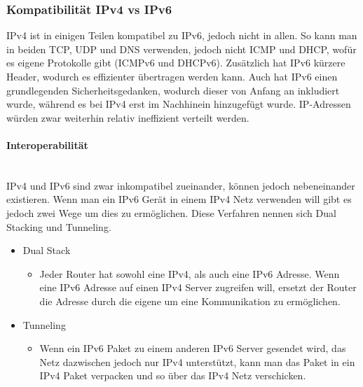 \documentclass{article}
\newcommand{\paragraphlb}[1]{\paragraph{#1}\mbox{}\\}
\begin{document}
	  \subsubsection{Kompatibilität IPv4 vs IPv6}
	  IPv4 ist in einigen Teilen kompatibel zu IPv6, jedoch nicht in allen. So kann man in beiden TCP, UDP und DNS verwenden, jedoch nicht ICMP und DHCP, wofür es eigene Protokolle gibt (ICMPv6 und DHCPv6). Zusätzlich hat IPv6 kürzere Header, wodurch es effizienter übertragen werden kann. Auch hat IPv6 einen grundlegenden Sicherheitsgedanken, wodurch dieser von Anfang an inkludiert wurde, während es bei IPv4 erst im Nachhinein hinzugefügt wurde. IP-Adressen würden zwar weiterhin relativ ineffizient verteilt werden. \\
	  \paragraphlb{Interoperabilität}
	  IPv4 und IPv6 sind zwar inkompatibel zueinander, können jedoch nebeneinander existieren. Wenn man ein IPv6 Gerät in einem IPv4 Netz verwenden will gibt es jedoch zwei Wege um dies zu ermöglichen. Diese Verfahren nennen sich Dual Stacking und Tunneling.
	  \begin{itemize}
	  	 	\item{Dual Stack}
	  	 	\begin{itemize}
	  	 		\item{Jeder Router hat sowohl eine IPv4, als auch eine IPv6 Adresse. Wenn eine IPv6 Adresse auf einen IPv4 Server zugreifen will, ersetzt der Router die Adresse durch die eigene um eine Kommunikation zu ermöglichen.}
	  	 	\end{itemize}
	  	 	\item{Tunneling}
	  	 	\begin{itemize}
	  	 		\item{Wenn ein IPv6 Paket zu einem anderen IPv6 Server gesendet wird, das Netz dazwischen jedoch nur IPv4 unterstützt, kann man das Paket in ein IPv4 Paket verpacken und so über das IPv4 Netz verschicken.}
	  	 	\end{itemize}
	  \end{itemize}	 
\end{document}

